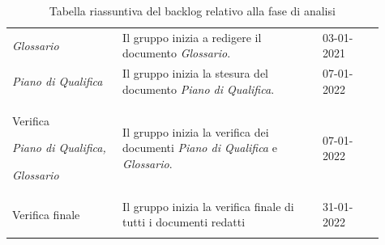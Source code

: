 {\begin{longtable}{p{0.27\linewidth}p{0.49\linewidth}p{0.15\linewidth}}
    \rowcolor[RGB]{216, 235, 171}
    \textit{Glossario} & Il gruppo inizia a redigere il documento \textit{Glossario}. & 03-01-2021\\

    \rowcolor[RGB]{233, 245, 206}
    \textit{Piano di Qualifica} & Il gruppo inizia la stesura del documento \textit{Piano di Qualifica}. & 07-01-2022\\

    \rowcolor[RGB]{216, 235, 171}
    Verifica \par \textit{Piano di Qualifica,} \par \textit{Glossario} & Il gruppo inizia la verifica dei documenti \textit{Piano di Qualifica} e \textit{Glossario}. & 07-01-2022\\

    \rowcolor[RGB]{233, 245, 206}
    Verifica finale & Il gruppo inizia la verifica finale di tutti i documenti redatti & 31-01-2022\\

    \caption{Tabella riassuntiva del backlog relativo alla fase di analisi}
\end{longtable}	
}

